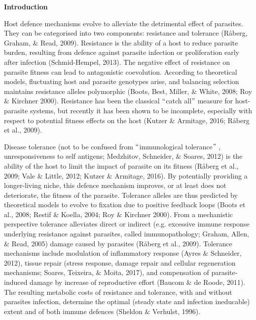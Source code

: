 \documentclass[12pt]{article}
\renewcommand{\_}{\kern-1.5pt\textunderscore\kern-1.5pt}
\begin{document}
{\fontsize{14pt}{16.8pt}\selectfont \textbf{Introduction}\par}\par

\textcolor[HTML]{00000A}{H}ost defence mechanisms evolve to alleviate the detrimental effect of parasites. They can be categorised into two components: resistance and tolerance (Råberg, Graham, $\&$  Read, 2009). Resistance is the ability of a host to reduce parasite burden, resulting from defence against parasite infection or proliferation early after infection (Schmid-Hempel, 2013). The negative effect of resistance on parasite fitness can lead to antagonistic coevolution. According to theoretical models, fluctuating host and parasite genotypes arise, and balancing selection maintains resistance alleles polymorphic (Boots, Best, Miller, $\&$  White, 2008; Roy $\&$  Kirchner 2000)\textcolor[HTML]{666666}{.} Resistance has been the classical $``$catch all$"$  measure for host-parasite systems, but recently it has been shown to be incomplete, especially with respect to potential fitness effects on the host (Kutzer $\&$  Armitage, 2016; Råberg et al., 2009).\par

Disease tolerance (not to be confused from $``$immunological tolerance$"$ , unresponsiveness to self antigens; Medzhitov, Schneider, $\&$  Soares, 2012) is the ability of the host to limit the impact of parasite on its fitness (Råberg et al., 2009; Vale $\&$  Little, 2012; Kutzer $\&$  Armitage, 2016). By potentially providing a longer-living niche, this defence mechanism improves, or at least does not deteriorate, the fitness of the parasite. Tolerance alleles are thus predicted by theoretical models to evolve to fixation due to positive feedback loops (Boots et al., 2008; Restif $\&$  Koella, 2004; Roy $\&$  Kirchner 2000). From a mechanistic perspective tolerance alleviates direct or indirect (e.g. excessive immune response underlying resistance against parasites, called immunopathology; Graham, Allen, $\&$  Read, 2005) damage caused by parasites (Råberg et al., 2009). Tolerance mechanisms include modulation of inflammatory response (Ayres $\&$  Schneider, 2012), tissue repair (stress response, damage repair and cellular regeneration mechanisms; Soares, Teixeira, $\&$  Moita, 2017), and compensation of parasite‐induced damage by increase of reproductive effort (Baucom $\&$  de Roode, 2011). The resulting metabolic costs of resistance and tolerance, with and without parasites infection, determine the optimal (steady state and infection ineducable) extent and of both immune defences (Sheldon $\&$  Verhulst, 1996).\par
\end{document}
